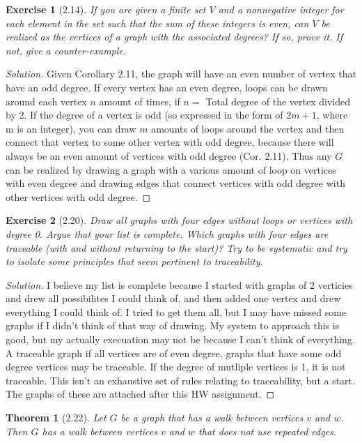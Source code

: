\documentclass{article}
\newtheorem*{thm}{Theorem}
\newtheorem*{ex}{Exercise}
\newenvironment{solution}
  {\begin{proof}[Solution]}
  {\renewcommand{\qedsymbol}{}\end{proof}}
\begin{document}
\begin{ex}[2.14]
	If you are given a finite set $V$ and a nonnegative integer for each element in the set such that the sum of these integers is even, can $V$ be realized as the vertices of a graph with the associated degrees? 
	If so, prove it. If not, give a counter-example.
\end{ex}
\begin{solution}
	Given Corollary 2.11, the graph will have an even number of vertex that have an odd degree. If every vertex has an even degree, loops can be drawn around each vertex $n$ amount of times, 
	if $n =$ Total degree of the vertex divided by 2.  If the degree of a vertex is odd (so expressed in the form of $2m + 1$, where m is an integer), you can draw $m$ amounts of loops around the vertex and then connect that 
	vertex to some other vertex with odd degree, because there will always be an even amount of vertices with odd degree (Cor. 2.11). Thus any $G$ can be realized by drawing a graph with a various amount of loop on vertices
	with even degree and drawing edges that connect vertices with odd degree with other vertices with odd degree.  
\end{solution}

\begin{ex}[2.20]
	Draw all graphs with four edges without loops or vertices with degree 0. Argue that your list is complete. Which graphs with four edges are traceable (with and without returning to the start)? 
	Try to be systematic and try to isolate some principles that seem pertinent to traceability.
\end{ex}
\begin{solution}
    I believe my list is complete because I started with graphs of 2 verticies and drew all possibilites I could think of, and then added one vertex and 
	drew everything I could think of. I tried to get them all, but I may have missed some graphs if I didn't think of that way of drawing. My system 
	to approach this is good, but my actually execuation may not be because I can't think of everything. A traceable graph if all vertices are of  even degree, graphs that have some odd degree vertices may be traceable. If the degree of mutliple vertices is 1, it is not traceable. This isn't an exhaustive set of rules relating to traceability, but a start. The graphs of these are attached after this HW assignment.  
\end{solution}


\begin{thm}[2.22]
	Let $G$ be a graph that has a walk between vertices $v$ and $w$. Then $G$ has a walk between vertices $v$ and $w$ that does not use repeated edges. \end{thm}
\end{document}

